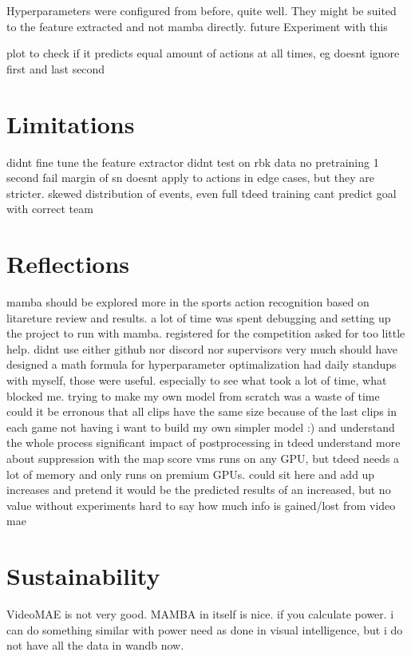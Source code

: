 Hyperparameters were configured from before, quite well. 
They might be suited to the feature extracted and not mamba directly. 
future Experiment with this


plot to check if it predicts equal amount of actions at all times, eg doesnt ignore first and last second 

\section{Limitations}
didnt fine tune the feature extractor
didnt test on rbk data
no pretraining
1 second fail margin of sn doesnt apply to actions in edge cases, but they are stricter. 
skewed distribution of events, even full tdeed training cant predict goal with correct team

\section{Reflections}
mamba should be explored more in the sports action recognition based on litareture review and results. 
a lot of time was spent debugging and setting up the project to run with mamba. 
registered for the competition
asked for too little help. didnt use either github nor discord nor supervisors very much
should have designed a math formula for hyperparameter optimalization
had daily standups with myself, those were useful. especially to see what took a lot of time, what blocked me.
trying to make my own model from scratch was a waste of time
could it be erronous that all clips have the same size because of the last clips in each game not having
i want to build my own simpler model :) and understand the whole process
significant impact of postprocessing in tdeed
understand more about suppression with the map score
vms runs on any GPU, but tdeed needs a lot of memory and only runs on premium GPUs.
could sit here and add up increases and pretend it would be the predicted results of an increased, but no value without experiments
hard to say how much info is gained/lost from video mae

\section{Sustainability}
VideoMAE is not very good. MAMBA in itself is nice. if you calculate power. i can do something similar with power need as done in visual intelligence, but i do not have all the data in wandb now. 
